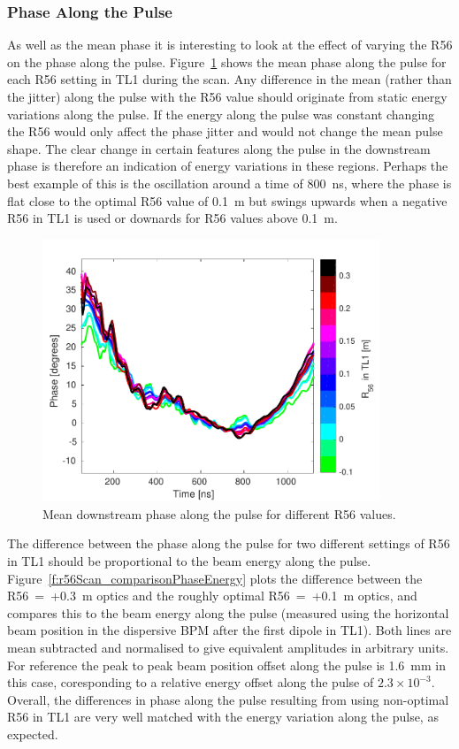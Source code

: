 \subsubsection{Phase Along the Pulse}

As well as the mean phase it is interesting to look at the effect of varying the R56 on the phase along the pulse. Figure~\ref{f:r56Scan_meanPhaseAlong} shows the mean phase along the pulse for each R56 setting in TL1 during the scan. Any difference in the mean (rather than the jitter) along the pulse with the R56 value should originate from static energy variations along the pulse. If the energy along the pulse was constant changing the R56 would only affect the phase jitter and would not change the mean pulse shape. The clear change in certain features along the pulse in the downstream phase is therefore an indication of energy variations in these regions. Perhaps the best example of this is the oscillation around a time of 800~ns, where the phase is flat close to the optimal R56 value of 0.1~m but swings upwards when a negative R56 in TL1 is used or downards for R56 values above 0.1~m.

\begin{figure}
  \centering
  \includegraphics[width=0.9\textwidth]{Figures/propagation/r56Scan_meanPhaseAlong}
  \caption{Mean downstream phase along the pulse for different R56 values.}
  \label{f:r56Scan_meanPhaseAlong}
\end{figure}

The difference between the phase along the pulse for two different settings of R56 in TL1 should be proportional to the beam energy along the pulse. Figure~\ref{f:r56Scan_comparisonPhaseEnergy} plots the difference between the R56~=~+0.3~m optics and the roughly optimal R56~=~+0.1~m optics, and compares this to the beam energy along the pulse (measured using the horizontal beam position in the dispersive BPM after the first dipole in TL1). Both lines are mean subtracted and normalised to give equivalent amplitudes in arbitrary units. For reference the peak to peak beam position offset along the pulse is 1.6~mm in this case, coresponding to a relative energy offset along the pulse of \(2.3\times10^{-3}\). Overall, the differences in phase along the pulse resulting from using non-optimal R56 in TL1 are very well matched with the energy variation along the pulse, as expected.

